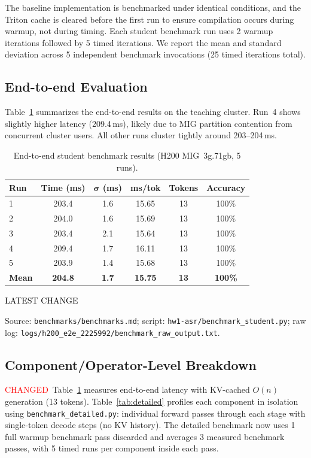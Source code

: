 \documentclass{article}
\newcommand{\chg}[1]{{\color{blue}#1}}
\newcommand{\chglabel}{{\setlength{\fboxsep}{1pt}\colorbox{yellow!45}{\textcolor{red}{\scriptsize CHANGED}}}}
\newcommand{\latestchglabel}{{\setlength{\fboxsep}{1pt}\colorbox{yellow!65}{\textcolor{black}{\scriptsize LATEST CHANGE}}}}
\newcommand{\latestsource}[1]{%
  \par\noindent
  {\footnotesize \latestchglabel\ \parbox[t]{0.9\linewidth}{#1}}\par
}
\begin{document}
The baseline implementation is benchmarked under identical conditions, and the Triton cache is cleared before the first run to ensure compilation occurs during warmup, not during timing.
Each student benchmark run uses 2 warmup iterations followed by 5 timed iterations.  We report the mean and standard deviation across 5 independent benchmark invocations (25 timed iterations total).

\subsection{End-to-end Evaluation}

Table~\ref{tab:e2e} summarizes the end-to-end results on the teaching cluster.  Run~4 shows slightly higher latency (209.4\,ms), likely due to MIG partition contention from concurrent cluster users. All other runs cluster tightly around 203--204\,ms.

\begin{table}[h]
\centering
\caption{End-to-end student benchmark results (H200 MIG~3g.71gb, 5 runs).}
\label{tab:e2e}
\small
\begin{tabular}{@{}lccccc@{}}
\toprule
\textbf{Run} & \textbf{Time (ms)} & $\boldsymbol{\sigma}$ \textbf{(ms)} & \textbf{ms/tok} & \textbf{Tokens} & \textbf{Accuracy} \\
\midrule
1 & 203.4 & 1.6 & 15.65 & 13 & 100\% \\
2 & 204.0 & 1.6 & 15.69 & 13 & 100\% \\
3 & 203.4 & 2.1 & 15.64 & 13 & 100\% \\
4 & 209.4 & 1.7 & 16.11 & 13 & 100\% \\
5 & 203.9 & 1.4 & 15.68 & 13 & 100\% \\
\midrule
\textbf{Mean} & \textbf{204.8} & \textbf{1.7} & \textbf{15.75} & \textbf{13} & \textbf{100\%} \\
\bottomrule
\end{tabular}
\end{table}

\latestsource{Source: \texttt{benchmarks/benchmarks.md}; script: \texttt{hw1-asr/benchmark\_student.py}; raw log: \texttt{logs/h200\_e2e\_2225992/benchmark\_raw\_output.txt}.}

\subsection{Component/Operator-Level Breakdown}

\chglabel\ \chg{Table~\ref{tab:e2e} measures end-to-end latency with KV-cached $O(n)$ generation (13 tokens).  Table~\ref{tab:detailed} profiles each component in isolation using \texttt{benchmark\_detailed.py}: individual forward passes through each stage with single-token decode steps (no KV history).  The detailed benchmark now uses 1 full warmup benchmark pass discarded and averages 3 measured benchmark passes, with 5 timed runs per component inside each pass.}
\end{document}
